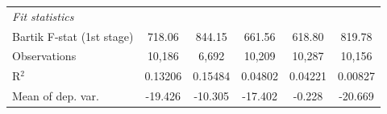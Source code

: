 \begin{tabular}{lccccc}
   \midrule
   \emph{Fit statistics}\\
   Bartik F-stat (1st stage)                                     & 718.06         & 844.15                         & 661.56                            & 618.80                             & 819.78\\  
   Observations                                                          & 10,186         & 6,692                          & 10,209                            & 10,287                             & 10,156\\  
   R$^2$                                                                 & 0.13206        & 0.15484                        & 0.04802                           & 0.04221                            & 0.00827\\  
   Mean of dep. var.                                                     & -19.426        & -10.305                        & -17.402                           & -0.228                             & -20.669\\  
\bottomrule
\end{tabular}
